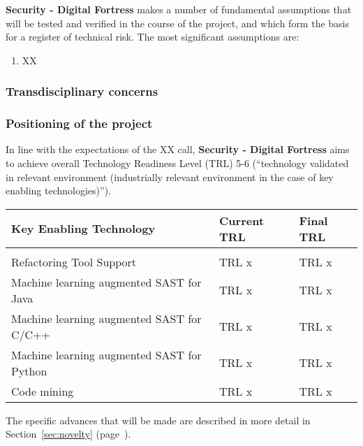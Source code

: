 \documentclass[a4paper,11pt]{article}
\newcommand{\project}[1]{\textbf{#1}\xspace}
\newcommand{\SECURITY}{\project{Security - Digital Fortress}}
\newcommand{\TheProject}{\SECURITY}
\begin{document}

\TheProject{} makes a number of fundamental assumptions that will be tested and verified in the course of the project,
and which form the basis for a register of technical risk.  The most significant assumptions are:

\begin{enumerate}[{A}1)]
\item XX
\end{enumerate}

\subsubsection*{Transdisciplinary concerns}


\subsubsection{Positioning of the project}

In line with the expectations of the XX call, \TheProject{} aims
to achieve overall Technology Readiness Level (TRL) 5-6 (``technology
validated in relevant environment (industrially relevant environment in
the case of key enabling technologies)'').

\begin{center}
  \begin{tabular}{|p{4.9in}|l|l|}
    \hline
    \textbf{Key Enabling Technology} & \textbf{Current TRL} & \textbf{Final TRL} \\
    \hline
     &  & \\
    \hline Refactoring Tool Support & TRL x & TRL x \\  
    \hline Machine learning augmented SAST for Java & TRL x & TRL x \\  
    \hline Machine learning augmented SAST for C/C++ & TRL x & TRL x \\  
    \hline Machine learning augmented SAST for Python & TRL x & TRL x \\  
    \hline Code mining & TRL x & TRL x \\  
    \hline
  \end{tabular}
\end{center}

\noindent
The specific advances that will be made are described in more detail in Section~\ref{sec:novelty} (page~\pageref{sec:novelty}).
\end{document}
